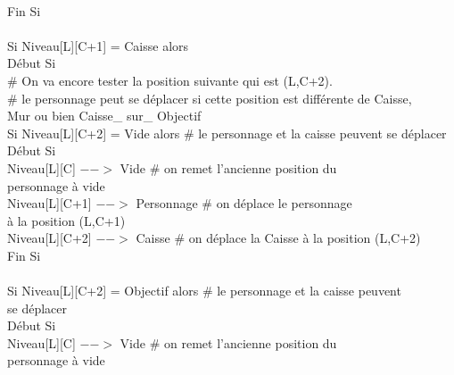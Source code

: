 \documentclass{article}
\begin{document}
\begin{tabbing}
\\	\hspace{3cm}	Fin Si 
\\		
\\	\hspace{3cm}	Si Niveau[L][C+1] = Caisse alors			
\\	\hspace{3cm}	Début Si
\\	\hspace{4cm}		\# On va encore tester la position suivante qui est (L,C+2). 
\\	\hspace{4cm}		\# le personnage peut se déplacer si cette position est différente de Caisse, 
\\  \hspace{4cm} Mur ou bien Caisse\_ sur\_ Objectif
\\	\hspace{4cm}		Si Niveau[L][C+2] = Vide alors          \# le personnage et la caisse peuvent se déplacer
\\	\hspace{4cm}		Début Si
\\	\hspace{5cm}			Niveau[L][C] $-->$ Vide 		\# on remet l'ancienne position du 
\\ \hspace{5cm} personnage à vide
\\	\hspace{5cm}			Niveau[L][C+1] $-->$ Personnage	\# on déplace le personnage 
\\ \hspace{5cm} à la position (L,C+1)
\\	\hspace{5cm}			Niveau[L][C+2] $-->$ Caisse	\# on déplace la Caisse à la position (L,C+2)
\\	\hspace{4cm}		Fin Si
\\
\\	\hspace{4cm}	Si Niveau[L][C+2] = Objectif alors         	\# le personnage et la caisse peuvent 
\\ \hspace{4cm} se déplacer
\\	\hspace{4cm}		Début Si
\\	\hspace{5cm}			Niveau[L][C] $-->$ Vide 			\# on remet l'ancienne position du 
\\ \hspace{5cm} personnage à vide

\end{tabbing}
\end{document}
